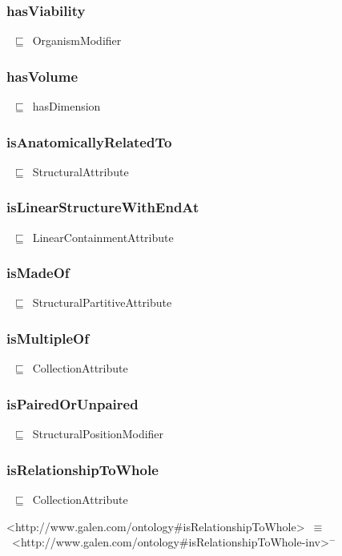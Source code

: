 \documentclass{article}
\begin{document}
\subsubsection*{hasViability}

~\ensuremath{\sqsubseteq}~OrganismModifier

\subsubsection*{hasVolume}

~\ensuremath{\sqsubseteq}~hasDimension

\subsubsection*{isAnatomicallyRelatedTo}

~\ensuremath{\sqsubseteq}~StructuralAttribute

\subsubsection*{isLinearStructureWithEndAt}

~\ensuremath{\sqsubseteq}~LinearContainmentAttribute

\subsubsection*{isMadeOf}

~\ensuremath{\sqsubseteq}~StructuralPartitiveAttribute

\subsubsection*{isMultipleOf}

~\ensuremath{\sqsubseteq}~CollectionAttribute

\subsubsection*{isPairedOrUnpaired}

~\ensuremath{\sqsubseteq}~StructuralPositionModifier

\subsubsection*{isRelationshipToWhole}

~\ensuremath{\sqsubseteq}~CollectionAttribute

<http://www.galen.com/ontology#isRelationshipToWhole>~\ensuremath{\equiv}~<http://www.galen.com/ontology#isRelationshipToWhole-inv>\ensuremath{^-}
\end{document}
